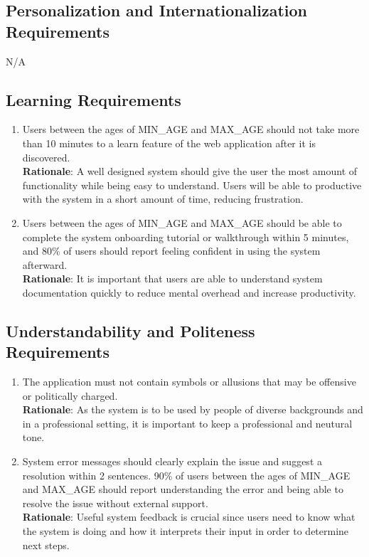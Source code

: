 \documentclass[12pt]{article}
\begin{document}
\subsection{Personalization and Internationalization Requirements}
N/A
\subsection{Learning Requirements}
\begin{enumerate}[{UH-LR}1.]
    \item Users between the ages of {MIN\_AGE} and {MAX\_AGE} should not take
      more than 10 minutes to a learn feature of the web application after it is
      discovered.\\
      \textbf{Rationale}: A well designed system should give the user the most amount of
      functionality while being easy to understand. Users will be able to
      productive with the system in a short amount of time, reducing
      frustration.
    \item Users between the ages of {MIN\_AGE} and {MAX\_AGE} should be able to 
      complete the system onboarding tutorial or walkthrough within 5 minutes,
      and 80\% of users should report feeling confident in using the system afterward.\\
      \textbf{Rationale}: It is important that users are able to understand
      system documentation quickly to reduce mental overhead and increase
      productivity.
\end{enumerate}
\subsection{Understandability and Politeness Requirements}
\begin{enumerate}[{UH-UP}1.]
    \item The application must not contain symbols or allusions that
      may be offensive or politically charged.\\
      \textbf{Rationale}: As the system is to be used by people of diverse backgrounds
      and in a professional setting, it is important to keep a professional and
      neutural tone.
    \item System error messages should clearly explain the issue and suggest a resolution
      within 2 sentences. 90\% of users between the ages of {MIN\_AGE} and {MAX\_AGE}
      should report understanding the error and being able to resolve the issue without
      external support.\\
      \textbf{Rationale}: Useful system feedback is crucial since users need to
      know what the system is doing and how it interprets their input in order to
      determine next steps.
\end{enumerate}
\end{document}
